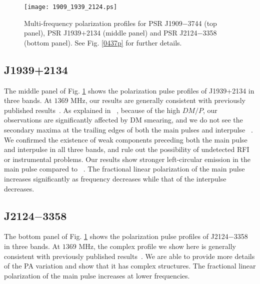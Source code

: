 \documentclass[useAMS,usenatbib]{mn2e}
\begin{document}
\begin{figure}
\begin{center}
\texttt{[image: 1909\_1939\_2124.ps]}
\caption{Multi-frequency polarization profiles for PSR J1909$-$3744 (top 
panel), PSR J1939$+$2134 (middle panel) and PSR J2124$-$3358 (bottom panel). 
See Fig. \ref{0437p} for further details.}
\label{1909p}
\end{center}
\end{figure}

\subsection{J1939+2134}

The middle panel of Fig. \ref{1909p} shows the polarization pulse profiles of 
J1939+2134 
in three bands.
%
At $1369$ MHz, our results are generally consistent with previously published 
results~\citep{Yan11}.
%
As explained in ~\citet{Yan11}, because of the high $DM/P$, our observations 
are significantly affected by DM smearing, and we do not see the secondary 
maxima at the trailing edges of both the main pulses and interpulse
~\citep{Thorsett90,Stairs99,Ord04}.
%
We confirmed the existence of weak components preceding both the main pulse 
and interpulse in all three bands, and rule out the possibility of undetected 
RFI or instrumental problems.
%
Our results show stronger left-circular emission in the main pulse compared 
to ~\citep{Yan11}.
%
The fractional linear polarization of the main pulse increases significantly 
as frequency decreases while that of the interpulse decreases.



\subsection{J2124$-$3358}

The bottom panel of Fig. \ref{1909p} shows the polarization pulse profiles of 
J2124$-$3358 
in three bands.
%
At $1369$ MHz, the complex profile we show here is generally consistent with previously published results~\citep{Yan11}.
%
We are able to provide more details of the PA variation and show that it has 
complex structures.
%
The fractional linear polarization of the main pulse increases at lower 
frequencies.
\end{document}
